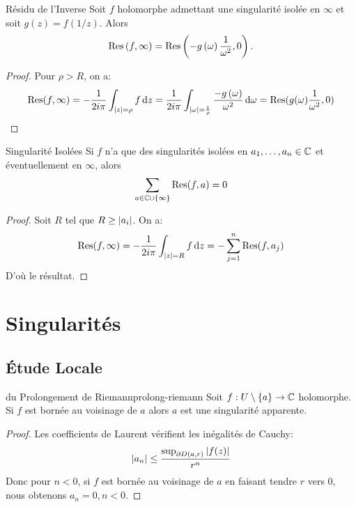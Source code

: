 \documentclass{cours}
\begin{document}
\begin{lemme}
	{Résidu de l'Inverse}{}
	Soit $f$ holomorphe admettant une singularité isolée en $\infty$ et soit $g\left(z\right) = f\left(1/z\right)$. Alors
	\begin{equation*}
		\mathrm{Res}\left(f, \infty\right) = \mathrm{Res}\left(-g\left(\omega\right)\frac{1}{\omega^{2}}, 0\right).
	\end{equation*}
\end{lemme}
\begin{proof}
	Pour $\rho > R$, on a:
	\begin{equation*}
		\mathrm{Res}(f, \infty) = - \frac{1}{2i\pi}\int_{\left|z\right| = \rho} f{\rm \, d} z = \frac{1}{2i\pi}\int_{\left|\omega\right| = \frac{1}{\rho}} \frac{-g\left(\omega\right)}{\omega^{2}}{\rm \, d}\omega = \mathrm{Res}(g(\omega)\frac{1}{\omega^{2}}, 0)
	\end{equation*}
\end{proof}

\begin{corollaire}
	{Singularité Isolées}{}
	Si $f$ n'a que des singularités isolées en $a_{1}, \ldots, a_{n} \in \mathbb{C}$ et éventuellement en $\infty$, alors 
	\begin{equation*}
		\sum_{a\in \mathbb{C}\cup\{\infty\}} \mathrm{Res}(f, a) = 0
	\end{equation*}
\end{corollaire}
\begin{proof}
	Soit $R$ tel que $R \geq \left|a_{i}\right|$. On a: 
	\begin{equation*}
		\mathrm{Res}(f, \infty) = -\frac{1}{2i\pi}\int_{\left|z\right| = R} f{\rm \, d} z = -\sum_{j = 1}^{n}\mathrm{Res}(f, a_{j})
	\end{equation*}
	D'où le résultat.
\end{proof}

\section{Singularités}
\subsection{Étude Locale}
\begin{théorème}
	{du Prolongement de Riemann}{prolong-riemann}
	Soit $f : U\setminus \{a\} \to \mathbb{C}$ holomorphe. Si $f$ est bornée au voisinage de $a$ alors $a$ est une singularité apparente. 
\end{théorème}
\begin{proof}
	Les coefficients de Laurent vérifient les inégalités de Cauchy: 
	\begin{equation*}
		\left|a_{n}\right| \leq \frac{\sup_{\partial D(a, r)}\left|f(z)\right|}{r^{n}}
	\end{equation*}
	Donc pour $n < 0$, si $f$ est bornée au voisinage de $a$ en faisant tendre $r$ vers $0$, nous obtenons $a_{n} = 0, n < 0$.
\end{proof}
\end{document}
